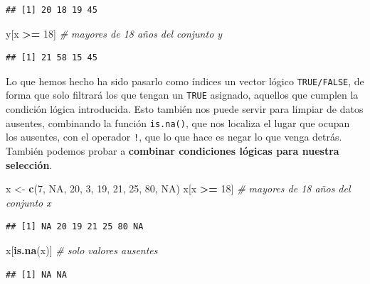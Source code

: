 \documentclass[11pt,]{book}
\newenvironment{Shaded}{\begin{snugshade}}{\end{snugshade}}
\newcommand{\CommentTok}[1]{\textcolor[rgb]{0.37,0.37,0.37}{\textit{#1}}}
\newcommand{\DecValTok}[1]{\textcolor[rgb]{0.06,0.06,0.06}{#1}}
\newcommand{\KeywordTok}[1]{\textcolor[rgb]{0.27,0.27,0.27}{\textbf{#1}}}
\newcommand{\NormalTok}[1]{#1}
\newcommand{\OperatorTok}[1]{\textcolor[rgb]{0.43,0.43,0.43}{\textbf{#1}}}
\newcommand{\OtherTok}[1]{\textcolor[rgb]{0.37,0.37,0.37}{#1}}
\newcommand{\StringTok}[1]{\textcolor[rgb]{0.5,0.5,0.5}{#1}}
\begin{document}
\begin{verbatim}
## [1] 20 18 19 45
\end{verbatim}

\begin{Shaded}
\begin{Highlighting}[]
\NormalTok{y[x }\OperatorTok{>=}\StringTok{ }\DecValTok{18}\NormalTok{] }\CommentTok{# mayores de 18 años del conjunto y}
\end{Highlighting}
\end{Shaded}

\begin{verbatim}
## [1] 21 58 15 45
\end{verbatim}

Lo que hemos hecho ha sido pasarlo como índices un vector lógico \texttt{TRUE/FALSE}, de forma que solo filtrará los que tengan un \texttt{TRUE} asignado, aquellos que cumplen la condición lógica introducida. Esto también nos puede servir para limpiar de datos ausentes, combinando la función \texttt{is.na()}, que nos localiza el lugar que ocupan los ausentes, con el operador \texttt{!}, que lo que hace es negar lo que venga detrás. También podemos probar a \textbf{combinar condiciones lógicas para nuestra selección}.

\begin{Shaded}
\begin{Highlighting}[]
\NormalTok{x <-}\StringTok{ }\KeywordTok{c}\NormalTok{(}\DecValTok{7}\NormalTok{, }\OtherTok{NA}\NormalTok{, }\DecValTok{20}\NormalTok{, }\DecValTok{3}\NormalTok{, }\DecValTok{19}\NormalTok{, }\DecValTok{21}\NormalTok{, }\DecValTok{25}\NormalTok{, }\DecValTok{80}\NormalTok{, }\OtherTok{NA}\NormalTok{)}
\NormalTok{x[x }\OperatorTok{>=}\StringTok{ }\DecValTok{18}\NormalTok{] }\CommentTok{# mayores de 18 años del conjunto x}
\end{Highlighting}
\end{Shaded}

\begin{verbatim}
## [1] NA 20 19 21 25 80 NA
\end{verbatim}

\begin{Shaded}
\begin{Highlighting}[]
\NormalTok{x[}\KeywordTok{is.na}\NormalTok{(x)] }\CommentTok{# solo valores ausentes}
\end{Highlighting}
\end{Shaded}

\begin{verbatim}
## [1] NA NA
\end{verbatim}
\end{document}
